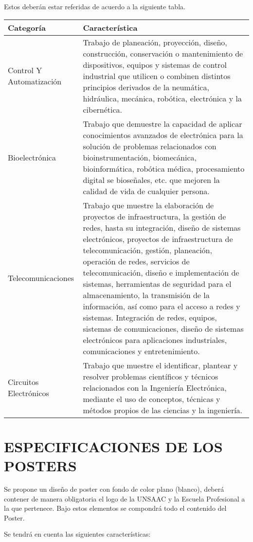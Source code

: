 \documentclass{article}
\begin{document}
Estos deberán estar referidas de acuerdo a la siguiente tabla.

\begin{tabular}{|p{5cm}|p{10cm}|}
\hline
\textbf{Categoría} & \textbf{Característica} \\ \hline
Control Y Automatización & Trabajo de planeación, proyección, diseño, construcción, conservación o mantenimiento de dispositivos, equipos y sistemas de control industrial que utilicen o combinen distintos principios derivados de la neumática, hidráulica, mecánica, robótica, electrónica y la cibernética. \\ \hline
Bioelectrónica & Trabajo que demuestre la capacidad de aplicar conocimientos avanzados de electrónica para la solución de problemas relacionados con bioinstrumentación, biomecánica, bioinformática, robótica médica, procesamiento digital se bioseñales, etc. que mejoren la calidad de vida de cualquier persona. \\ \hline
Telecomunicaciones &     Trabajo que muestre la elaboración de proyectos de infraestructura, la gestión de redes, hasta su integración, diseño de sistemas electrónicos, proyectos de infraestructura de telecomunicación, gestión, planeación, operación de redes, servicios de telecomunicación, diseño e implementación de sistemas, herramientas de seguridad para el almacenamiento, la transmisión de la información, así como para el acceso a redes y sistemas. Integración de redes, equipos, sistemas de comunicaciones, diseño de sistemas electrónicos para aplicaciones industriales, comunicaciones y entretenimiento. \\ \hline
Circuitos Electrónicos & Trabajo que muestre el identificar, plantear y resolver problemas científicos y técnicos relacionados con la Ingeniería Electrónica, mediante el uso de conceptos, técnicas y métodos propios de las ciencias y la ingeniería. \\ \hline
\end{tabular}

\section{ESPECIFICACIONES DE LOS POSTERS}
 Se propone un diseño de poster con fondo de color plano (blanco), deberá contener de manera obligatoria el logo de la UNSAAC y la Escuela Profesional a la que pertenece. Bajo estos elementos se compondrá todo el contenido del Poster.
 
 Se tendrá en cuenta las siguientes características:
 
\end{document}
